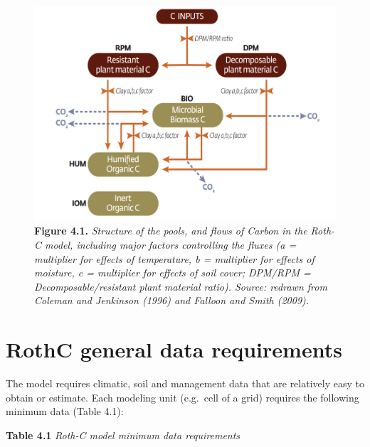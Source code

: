 \documentclass[
  10pt,
  b5paper,
]{book}
\begin{document}
\begin{figure}
\centering
\includegraphics{images/Figure_4.1.png}
\caption{\textbf{Figure 4.1.} \emph{Structure of the pools, and flows of Carbon in the Roth-C model, including major factors controlling the fluxes (a = multiplier for effects of temperature, b = multiplier for effects of moisture, c = multiplier for effects of soil cover; DPM/RPM = Decomposable/resistant plant material ratio). Source: redrawn from Coleman and Jenkinson (1996) and Falloon and Smith (2009).}}
\end{figure}

\hypertarget{rothc-general-data-requirements}{%
\section{RothC general data requirements}\label{rothc-general-data-requirements}}

The model requires climatic, soil and management data that are relatively easy to obtain or estimate. Each modeling unit (e.g.~cell of a grid) requires the following minimum data (Table 4.1):

\textbf{Table 4.1} \emph{Roth-C model minimum data requirements}
\end{document}
